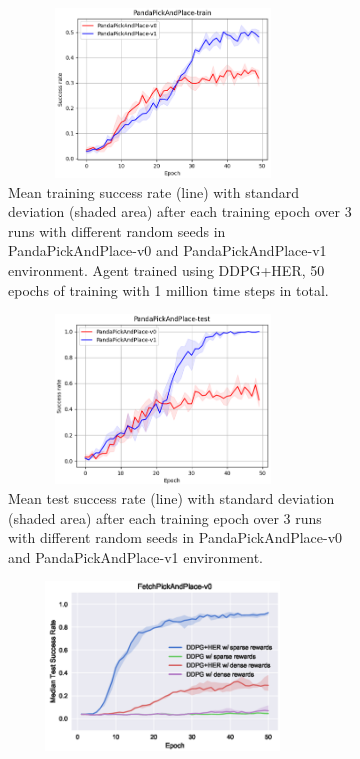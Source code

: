 \documentclass[conference]{IEEEtran}
\begin{document}
\begin{figure}[ht]
\centering
\begin{subfigure}[t]{0.30\textwidth}
\centering
\includegraphics[width=0.9\textwidth, height=4.5cm]{img/exp_deep_train.png}
\caption{Mean training success rate (line) with standard deviation (shaded area) after each training epoch over 3 runs with different random seeds in PandaPickAndPlace-v0 and PandaPickAndPlace-v1 environment. Agent trained using DDPG+HER, 50 epochs of training with 1 million time steps in total.}
\label{fig:exp_deep_train}
\end{subfigure}
\hspace{1em}
\begin{subfigure}[t]{0.30\textwidth}
\centering
\includegraphics[width=0.9\textwidth, height=4.5cm]{img/exp_deep_test.png}
\caption{Mean test success rate (line) with standard deviation (shaded area) after each training epoch over 3 runs with different random seeds in PandaPickAndPlace-v0 and PandaPickAndPlace-v1 environment.}
\label{fig:exp_deep_test}
\end{subfigure}
\hspace{1em}
\begin{subfigure}[t]{0.30\textwidth}
\centering
\includegraphics[width=0.9\textwidth, height=4.5cm]{img/exp_deep_test_plappert.png}

\end{subfigure}
\end{figure}
\end{document}

